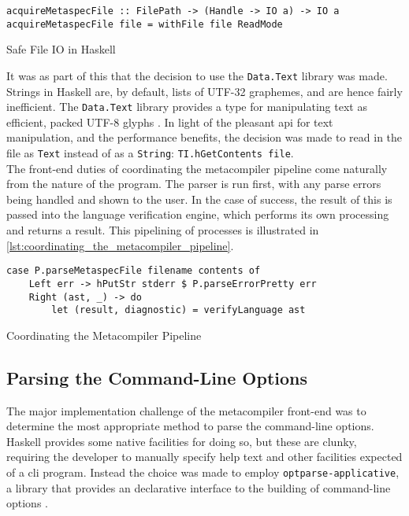 \begin{listing}[!htb]
\begin{verbatim}
acquireMetaspecFile :: FilePath -> (Handle -> IO a) -> IO a
acquireMetaspecFile file = withFile file ReadMode
\end{verbatim}
\caption{Safe File IO in Haskell}
\label{lst:safe_file_io_in_haskell}
\end{listing}

It was as part of this that the decision to use the \texttt{Data.Text} library was made. 
Strings in Haskell are, by default, lists of UTF-32 graphemes, and are hence fairly inefficient. 
The \texttt{Data.Text} library provides a type for manipulating text as efficient, packed UTF-8 glyphs \citep{haskell_data_text}.
In light of the pleasant \gls{api} for text manipulation, and the performance benefits, the decision was made to read in the file as \texttt{Text} instead of as a \texttt{String}: \texttt{TI.hGetContents file}.\\

The front-end duties of coordinating the metacompiler pipeline come naturally from the nature of the program.
The parser is run first, with any parse errors being handled and shown to the user.
In the case of success, the result of this is passed into the language verification engine, which performs its own processing and returns a result.
This pipelining of processes is illustrated in \autoref{lst:coordinating_the_metacompiler_pipeline}.

\begin{listing}[!htb]
\begin{verbatim}
case P.parseMetaspecFile filename contents of
    Left err -> hPutStr stderr $ P.parseErrorPretty err
    Right (ast, _) -> do
        let (result, diagnostic) = verifyLanguage ast
\end{verbatim}
\caption{Coordinating the Metacompiler Pipeline}
\label{lst:coordinating_the_metacompiler_pipeline}
\end{listing}

\subsection{Parsing the Command-Line Options} %
\label{sub:parsing_the_command_line_options}
The major implementation challenge of the metacompiler front-end was to determine the most appropriate method to parse the command-line options.
Haskell provides some native facilities for doing so, but these are clunky, requiring the developer to manually specify help text and other facilities expected of a \gls{cli} program.
Instead the choice was made to employ \texttt{optparse-applicative}, a library that provides an declarative interface to the building of command-line options \citep{optparse_applicative}.\\

